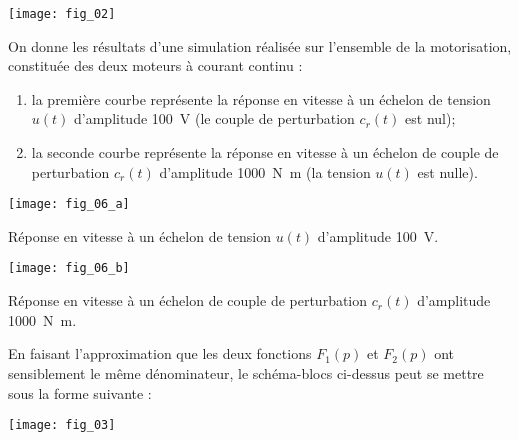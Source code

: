 \begin{center}
	\texttt{[image: fig\_02]}
\end{center}



On donne les résultats d’une simulation réalisée sur l’ensemble de la motorisation, constituée des deux moteurs à courant continu :
\begin{enumerate}
\item la première courbe représente la réponse en vitesse à un échelon de tension $u(t)$ d’amplitude \SI{100}{V} (le couple de perturbation $c_r(t)$ est nul);
\item la seconde courbe représente la réponse en vitesse à un échelon de couple de perturbation $c_r(t)$ d’amplitude \SI{1000}{N.m} (la tension $u(t)$ est nulle).
\end{enumerate}



\begin{marginfigure}
\texttt{[image: fig\_06\_a]}

\caption{Réponse en vitesse à un échelon de tension $u(t)$ d’amplitude \SI{100}{V}.}
\end{marginfigure}

\begin{marginfigure}
\texttt{[image: fig\_06\_b]}

\caption{Réponse en vitesse à un échelon de couple de perturbation $c_r(t)$ d’amplitude \SI{1000}{N.m}.}
\end{marginfigure}





En faisant l’approximation que les deux fonctions $F_1(p)$ et $F_2(p)$ ont sensiblement le même dénominateur, le schéma-blocs ci-dessus peut se mettre sous la forme suivante :
\begin{center}
	\texttt{[image: fig\_03]}
\end{center}


